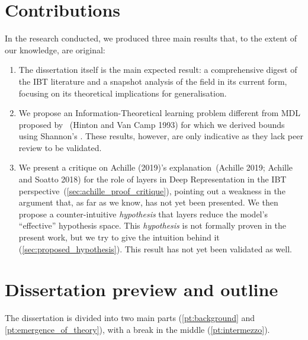 \documentclass[
  letterpaper,
]{tufte-book}
\begin{document}
\hypertarget{contributions}{%
\section{Contributions}\label{contributions}}

In the research conducted, we produced three main results that, to the
extent of our knowledge, are original:

\begin{enumerate}
\def\labelenumi{\arabic{enumi}.}
\item
  The dissertation itself is the main expected result: a comprehensive
  digest of the {IBT} literature and a snapshot analysis of the field in
  its current form, focusing on its theoretical implications for
  generalisation.
\item
  We propose an Information-Theoretical learning problem different from
  {MDL} proposed by ~(Hinton and Van Camp 1993) for which we derived
  bounds using Shannon's . These results, however, are only indicative
  as they lack peer review to be validated.
\item
  We present a critique on Achille (2019)'s explanation~(Achille 2019;
  Achille and Soatto 2018) for the role of layers in Deep Representation
  in the {IBT}
  perspective~(\protect\hyperlink{sec:achille_proof_critique}{{[}sec:achille\_proof\_critique{]}}),
  pointing out a weakness in the argument that, as far as we know, has
  not yet been presented. We then propose a counter-intuitive
  \emph{hypothesis} that layers reduce the model's ``effective''
  hypothesis space. This \emph{hypothesis} is not formally proven in the
  present work, but we try to give the intuition behind it
  (\protect\hyperlink{sec:proposed_hypothesis}{{[}sec:proposed\_hypothesis{]}}).
  This result has not yet been validated as well.
\end{enumerate}

\hypertarget{dissertation-preview-and-outline}{%
\section{Dissertation preview and
outline}\label{dissertation-preview-and-outline}}

The dissertation is divided into two main parts
(\protect\hyperlink{pt:background}{{[}pt:background{]}} and
\protect\hyperlink{pt:emergence_of_theory}{{[}pt:emergence\_of\_theory{]}}),
with a break in the middle
(\protect\hyperlink{pt:intermezzo}{{[}pt:intermezzo{]}}).
\end{document}
